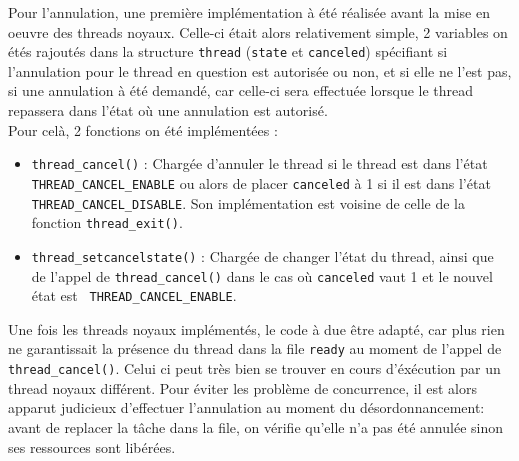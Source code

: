 Pour l'annulation, une première implémentation à été réalisée avant la mise en oeuvre des threads noyaux. Celle-ci était alors relativement simple, 2 variables on étés rajoutés dans la structure \verb!thread! (\verb!state! et \verb!canceled!) spécifiant si l'annulation pour le thread en question est autorisée ou non, et si elle ne l'est pas, si une annulation à été demandé, car celle-ci sera effectuée lorsque le thread repassera dans l'état où une annulation est autorisé.\\

Pour celà, 2 fonctions on été implémentées :
\begin{itemize}
\item \verb!thread_cancel()! : Chargée d'annuler le thread si le thread est dans l'état\\ \verb!THREAD_CANCEL_ENABLE! ou alors de placer \verb!canceled! à 1 si il est dans l'état \verb!THREAD_CANCEL_DISABLE!. Son implémentation est voisine de celle de la fonction \verb!thread_exit()!.\\
\item \verb!thread_setcancelstate()! : Chargée de changer l'état du thread, ainsi que de l'appel de \verb!thread_cancel()! dans le cas où \verb!canceled! vaut 1 et le nouvel état est \verb! THREAD_CANCEL_ENABLE!.
\end{itemize}

Une fois les threads noyaux implémentés, le code à due être adapté, car plus rien ne garantissait la présence du thread dans la file \verb!ready! au moment de l'appel de \verb!thread_cancel()!. Celui ci peut très bien se trouver en cours d'éxécution par un thread noyaux différent. Pour éviter les problème de concurrence, il est alors apparut judicieux d'effectuer l'annulation au moment du désordonnancement: avant de replacer la tâche dans la file, on vérifie qu'elle n'a pas été annulée sinon ses ressources sont libérées.
